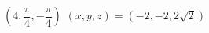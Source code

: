{$\left( 4, \dfrac{\pi}{4}, -\dfrac{\pi}{4} \right)$
}
{$(x,y,z) = \left( -2, -2, 2\sqrt{2} \right)$}